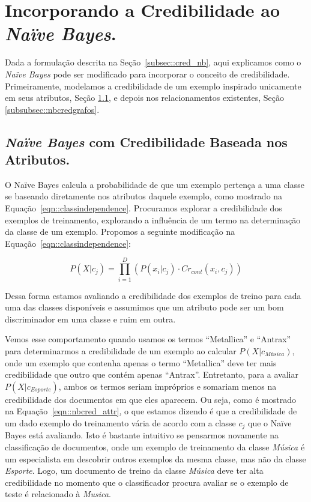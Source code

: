 \section{Incorporando a Credibilidade ao \textit{Naïve Bayes}.}
\label{subsubsec::nb_cred}

Dada a formulação descrita na Seção~\ref{subsec::cred_nb}, aqui explicamos como o \textit{Naïve Bayes} pode ser modificado para incorporar o conceito de credibilidade. Primeiramente, modelamos a credibilidade de um exemplo inspirado unicamente em seus atributos, Seção \ref{subsubsec::nbcredatributos}, e depois nos relacionamentos existentes, Seção \ref{subsubsec::nbcredgrafos}.

\subsection{\textit{Naïve Bayes} com Credibilidade Baseada nos Atributos.}
\label{subsubsec::nbcredatributos}


O Naïve Bayes calcula a probabilidade de que um exemplo pertença a uma classe se baseando diretamente nos atributos daquele exemplo, como mostrado na Equação~\ref{eqn::classindependence}.
Procuramos explorar a credibilidade dos exemplos de treinamento, explorando a influência de um termo na determinação da classe de um exemplo.
Propomos a seguinte modificação na Equação~\ref{eqn::classindependence}:

\begin{equation}\label{eqn::nbcred_attr}
   P(X|c_{j}) = \prod^{D}_{i=1}{(P(x_i|c_j) \cdot Cr_{cont}(x_i,c_j))} 
\end{equation}

Dessa forma estamos avaliando a credibilidade dos exemplos de treino para cada uma das classes disponíveis e assumimos que um atributo pode ser um bom discriminador em uma classe e ruim em outra. 

Vemos esse comportamento quando usamos os termos ``Metallica'' e ``Antrax'' para determinarmos a credibilidade de um exemplo ao calcular $P(X|c_{\textit{Música}})$, onde um exemplo que contenha apenas o termo ``Metallica'' deve ter mais credibilidade que outro que contém apenas ``Antrax''.
Entretanto, para a avaliar $P(X|c_{\textit{Esporte}})$, ambos os termos seriam impróprios e somariam menos na credibilidade dos documentos em que eles aparecem.
Ou seja, como é mostrado na Equação~\ref{eqn::nbcred_attr}, o que estamos dizendo é que a credibilidade de um dado exemplo do treinamento vária de acordo com a classe $c_j$ que o Naïve Bayes está avaliando. Isto é bastante intuitivo se pensarmos novamente na classificação de documentos, onde um exemplo de treinamento da classe \textit{Música} é um especialista em descobrir outros exemplos da mesma classe, mas não da classe \textit{Esporte}. Logo, um documento de treino da classe \textit{Música} deve ter alta credibilidade no momento que o classificador procura avaliar se o exemplo de teste é relacionado à \textit{Musica}.

